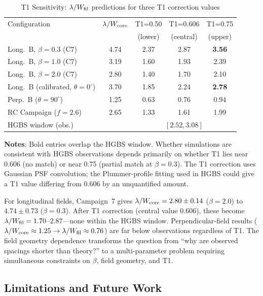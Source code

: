 \documentclass[twoside,twocolumn]{mnras}
\begin{document}
\begin{table}
\caption{T1 Sensitivity: $\lambda/W_{\rm fil}$ predictions for three T1 correction values}
\label{tab:t1_budget}
\small
\begin{tabular}{lcccc}
\toprule
Configuration & $\lambda/W_{\rm core}$ & T1=0.50 & T1=0.606 & T1=0.75 \\
              &                       & (lower) & (central) & (upper) \\
\midrule
Long.\ B, $\beta=0.3$ (C7) & 4.74 & 2.37 & 2.87 & \textbf{3.56} \\
Long.\ B, $\beta=1.0$ (C7) & 3.19 & 1.60 & 1.93 & 2.39 \\
Long.\ B, $\beta=2.0$ (C7) & 2.80 & 1.40 & 1.70 & 2.10 \\
Long.\ B (calibrated, $\theta=0^\circ$) & 3.70 & 1.85 & 2.24 & \textbf{2.78} \\
Perp.\ B ($\theta=90^\circ$) & 1.25 & 0.63 & 0.76 & 0.94 \\
RC Campaign ($f=2.6$) & 2.65 & 1.33 & 1.61 & 1.99 \\
\midrule
\multicolumn{2}{l}{HGBS window (obs.)} & \multicolumn{3}{c}{$[2.52, 3.08]$} \\
\bottomrule
\end{tabular}
\vspace{2pt}
\footnotesize
\textbf{Notes}: Bold entries overlap the HGBS window. Whether simulations are consistent
with HGBS observations depends primarily on whether T1 lies near 0.606 (no match) or
near 0.75 (partial match at $\beta=0.3$). The T1 correction uses Gaussian PSF
convolution; the Plummer-profile fitting used in HGBS could give a T1 value
differing from 0.606 by an unquantified amount.
\end{table}

For longitudinal fields, Campaign~7 gives $\lambda/W_{\rm core} = 2.80 \pm 0.14$
($\beta = 2.0$) to $4.74 \pm 0.73$ ($\beta = 0.3$). After T1 correction (central
value 0.606), these become $\lambda/W_{\rm fil} = 1.70$--$2.87$---none within the
HGBS window. Perpendicular-field results ($\lambda/W_{\rm core} \approx 1.25 \to
\lambda/W_{\rm fil} \approx 0.76$) are far below observations regardless of T1.
The field geometry dependence transforms the question from ``why are observed spacings
shorter than theory?'' to a multi-parameter problem requiring simultaneous constraints
on $\beta$, field geometry, and T1.

\subsection{Limitations and Future Work}
\end{document}
